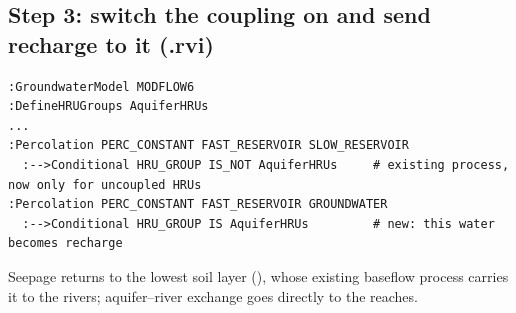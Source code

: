 \subsection{Step 3: switch the coupling on and send recharge to it (.rvi)}
\par\noindent\begin{minipage}{\linewidth}
\begin{lstlisting}
:GroundwaterModel MODFLOW6
:DefineHRUGroups AquiferHRUs
...
:Percolation PERC_CONSTANT FAST_RESERVOIR SLOW_RESERVOIR
  :-->Conditional HRU_GROUP IS_NOT AquiferHRUs     # existing process, now only for uncoupled HRUs
:Percolation PERC_CONSTANT FAST_RESERVOIR GROUNDWATER
  :-->Conditional HRU_GROUP IS AquiferHRUs         # new: this water becomes recharge
\end{lstlisting}
\end{minipage}\par\smallskip
Seepage returns to the lowest soil layer (), whose existing baseflow process carries it to the rivers;
aquifer--river exchange goes directly to the reaches.

